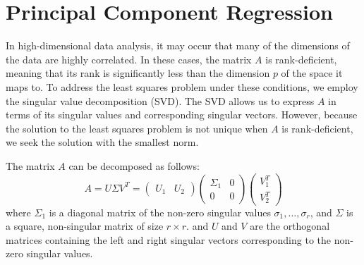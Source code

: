 \documentclass[a4paper, 12pt]{article}
\begin{document}
\section{Principal Component Regression}
In high-dimensional data analysis, it may occur that many of the dimensions of the data are highly correlated.
In these cases, the matrix $A$ is rank-deficient, meaning that its rank is significantly less than the dimension $p$ of
the space it maps to. To address the least squares problem under these conditions,
we employ the singular value decomposition (SVD). The SVD allows us to express $A$ in terms of its singular values and corresponding singular vectors. However, because the solution to the least squares problem is not unique when $A$ is rank-deficient, we seek the solution with the smallest norm.

The matrix $A$ can be decomposed as follows:
\[
A = U \Sigma V^T =
\begin{pmatrix} U_1 & U_2 \end{pmatrix}
\begin{pmatrix}
\Sigma_1 & 0 \\
0 & 0 
\end{pmatrix} \begin{pmatrix}
V_1^T \\
V_2^T
\end{pmatrix}
\]
where $\Sigma_1$ is a diagonal matrix of the non-zero singular values $\sigma_1, \ldots, \sigma_r$, and $\Sigma$ is a square, non-singular matrix of size $r \times r$.
and $U$ and $V$ are the orthogonal matrices containing the left and right singular vectors corresponding to the non-zero singular values.
\end{document}
